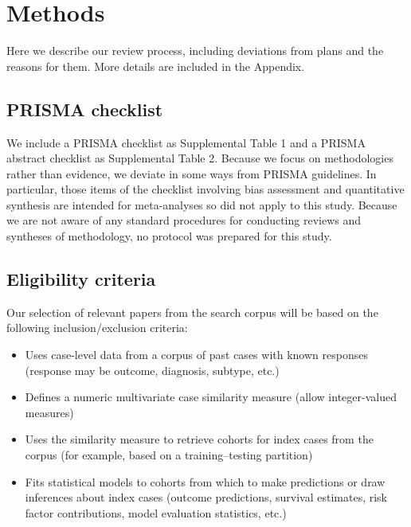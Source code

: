 \documentclass[sn-mathphys,Numbered,pdflatex]{sn-jnl}
\theoremstyle{remark}
\theoremstyle{definition}
\newcommand{\hl}[1]{#1}
\providecommand{\tightlist}{%
  \setlength{\itemsep}{0pt}\setlength{\parskip}{0pt}}
\begin{document}
\section{Methods}\label{methods}

Here we describe our review process, including deviations from plans and
the reasons for them. More details are included in \hl{the Appendix}.

\subsection{PRISMA checklist}\label{prisma-checklist}

We include a PRISMA checklist as Supplemental Table 1 and a PRISMA
abstract checklist as Supplemental Table 2. Because we focus on
methodologies rather than\hl{ evidence}, we deviate in some ways from
PRISMA guidelines. In particular, those items of the checklist involving
bias assessment and quantitative synthesis are intended for
meta-analyses so did not apply to this study. Because we are not aware
of any standard procedures for conducting reviews and syntheses of
methodology, no protocol was prepared for this study.

\subsection{Eligibility criteria}\label{eligibility-criteria}

\hl{Our selection of relevant papers from the search corpus will be based on the following inclusion/exclusion criteria:}

\begin{itemize}
\tightlist
\item
  \hl{Uses case-level data from a corpus of past cases with known responses}\newline
  \hl{(response may be outcome, diagnosis, subtype, etc.)}
\item
  \hl{Defines a numeric multivariate case similarity measure}\newline
  \hl{(allow integer-valued measures)}
\item
  \hl{Uses the similarity measure to retrieve cohorts for index cases from the corpus}\newline
  \hl{(for example, based on a training--testing partition)}
\item
  \hl{Fits statistical models to cohorts from which to make predictions or draw inferences about index cases}\newline
  \hl{(outcome predictions, survival estimates, risk factor contributions, model evaluation statistics, etc.)}
\end{itemize}
\end{document}
